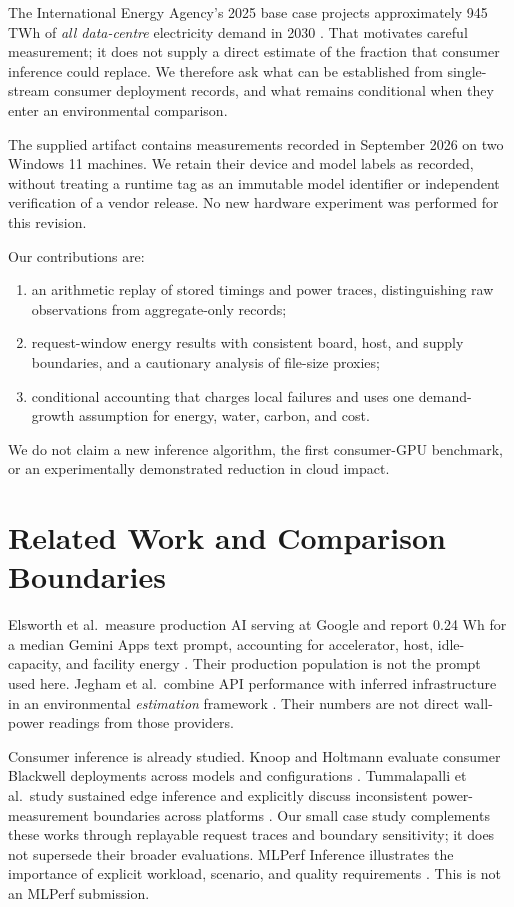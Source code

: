 \documentclass[conference]{IEEEtran}
\begin{document}
The International Energy Agency's 2025 base case projects approximately
945 TWh of \emph{all data-centre} electricity demand in 2030
\cite{iea2025}. That motivates careful measurement; it does not supply a
direct estimate of the fraction that consumer inference could replace.
We therefore ask what can be established from single-stream consumer
deployment records, and what remains conditional when they enter an
environmental comparison.

The supplied artifact contains measurements recorded in September 2026 on
two Windows 11 machines. We retain their device and model labels as
recorded, without treating a runtime tag as an immutable model identifier
or independent verification of a vendor release. No new hardware experiment
was performed for this revision.

Our contributions are:
\begin{enumerate}
\item an arithmetic replay of stored timings and power traces, distinguishing
raw observations from aggregate-only records;
\item request-window energy results with consistent board, host, and supply
boundaries, and a cautionary analysis of file-size proxies;
\item conditional accounting that charges local failures and uses one
demand-growth assumption for energy, water, carbon, and cost.
\end{enumerate}
We do not claim a new inference algorithm, the first consumer-GPU benchmark,
or an experimentally demonstrated reduction in cloud impact.

\section{Related Work and Comparison Boundaries}
Elsworth et al.\ measure production AI serving at Google and report
0.24 Wh for a median Gemini Apps text prompt, accounting for accelerator,
host, idle-capacity, and facility energy \cite{elsworth2025}.
Their production population is not the prompt used here.
Jegham et al.\ combine API performance with inferred infrastructure in an
environmental \emph{estimation} framework \cite{jegham2025}.
Their numbers are not direct wall-power readings from those providers.

Consumer inference is already studied. Knoop and Holtmann evaluate
consumer Blackwell deployments across models and configurations
\cite{knoop2026}. Tummalapalli et al.\ study sustained edge inference and
explicitly discuss inconsistent power-measurement boundaries across
platforms \cite{tummalapalli2026}. Our small case study complements these
works through replayable request traces and boundary sensitivity; it does
not supersede their broader evaluations. MLPerf Inference illustrates the
importance of explicit workload, scenario, and quality requirements
\cite{reddi2020mlperf}. This is not an MLPerf submission.
\end{document}
